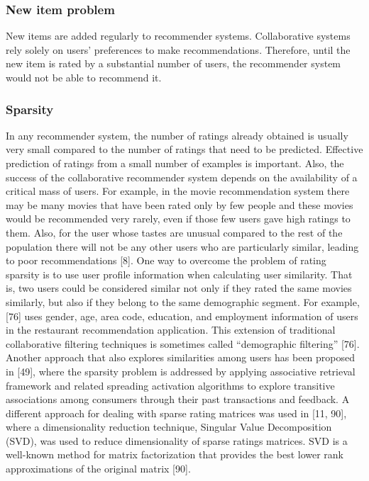 \subsubsection{New item problem}
New items are added regularly to recommender systems. Collaborative systems rely solely on users’ preferences to make recommendations. Therefore, until the new item is rated by a substantial number of users, the recommender system would not be able to recommend it.

\subsubsection{Sparsity}
In any recommender system, the number of ratings already obtained is usually very small compared to the number of ratings that need to be predicted. Effective prediction of ratings from a small number of examples is important. Also, the success of the collaborative recommender system depends on the availability of a critical mass of users. For example, in the movie recommendation system there may be many movies that have been rated only by few people and these movies would be recommended very rarely, even if those few users gave high ratings to them. Also, for the user whose tastes are unusual compared to the rest of the population there will not be any other users who are particularly similar, leading to poor recommendations [8]. One way to overcome the problem of rating sparsity is to use user profile information when calculating user similarity. That is, two users could be considered similar not only if they rated the same movies similarly, but also if they belong to the same demographic segment. For example, [76] uses gender, age, area code, education, and employment information of users in the restaurant recommendation application. This extension of traditional collaborative filtering techniques is sometimes called “demographic filtering” [76]. Another approach that also explores similarities among users has been proposed in [49], where the sparsity problem is addressed by applying associative retrieval framework and related spreading activation algorithms to explore transitive associations among consumers through their past transactions and feedback. A different approach for dealing with sparse rating matrices was used in [11, 90], where a dimensionality reduction technique, Singular Value Decomposition (SVD), was used to reduce dimensionality of sparse ratings matrices. SVD is a well-known method for matrix factorization that provides the best lower rank approximations of the original matrix [90].

